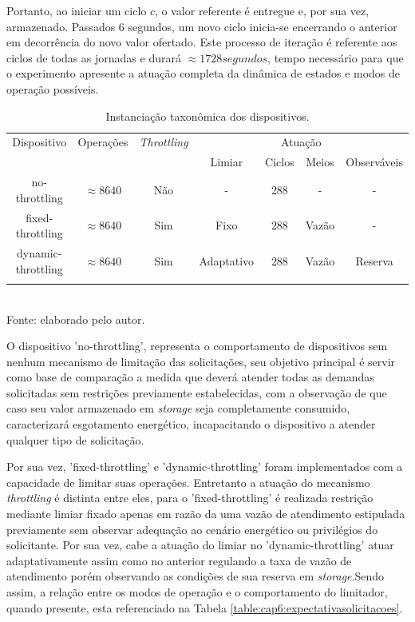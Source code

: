Portanto, ao iniciar um ciclo $c$, o valor referente é entregue e, por sua vez, armazenado. Passados 6 segundos, um novo ciclo inicia-se encerrando o anterior em decorrência do novo valor ofertado. Este processo de iteração é referente aos ciclos de todas as jornadas e durará $\approx 1728 segundos$, tempo necessário para que o experimento apresente a atuação completa da dinâmica de estados e modos de operação possíveis.

\begingroup
\begin{table}[htbp]
	
	\centering
	\caption{Instanciação taxonômica dos dispositivos.}
	\small
	\begin{tabular}{ c c c c c c c}
		\toprule
		Dispositivo & Operações & \textit{Throttling} & \multicolumn{4}{c}{Atuação}\\\cline{4-7}		
		& & & Limiar & Ciclos & Meios & Observáveis\\
		\midrule
		 no-throttling  & $\approx 8640$ &Não & - & 288 & - & - \\
		fixed-throttling  & $\approx 8640$ &Sim & Fixo & 288 & Vazão & - \\
		 dynamic-throttling  & $\approx 8640$ &Sim & Adaptativo & 288 & Vazão & Reserva \\
		\bottomrule\addlinespace[1pt]
	\end{tabular}
	\label{table:cap6:dispositivosutilizados}
	\\
	\footnotesize Fonte: elaborado pelo autor.
	
\end{table}
\endgroup

O dispositivo 'no-throttling', representa o comportamento de dispositivos sem nenhum mecanismo de limitação das solicitações, seu objetivo principal é servir como base de comparação a medida que deverá atender todas as demandas solicitadas sem restrições previamente estabelecidas, com a observação de que caso seu valor armazenado em \textit{storage} seja completamente consumido, caracterizará esgotamento energético, incapacitando o dispositivo a atender qualquer tipo de solicitação.

Por sua vez, 'fixed-throttling'  e 'dynamic-throttling' foram implementados com a capacidade de limitar suas operações. Entretanto a atuação do mecanismo \textit{throttling} é distinta entre eles, para o 'fixed-throttling' é realizada restrição mediante limiar fixado apenas em razão da uma vazão de atendimento estipulada previamente sem observar adequação ao cenário energético ou privilégios do solicitante. Por sua vez, cabe a atuação do limiar no 'dynamic-throttling' atuar adaptativamente assim como no anterior regulando a taxa de vazão de atendimento porém observando as condições de sua reserva em \textit{storage}.Sendo assim, a relação entre os modos de operação e o comportamento do limitador, quando presente, esta referenciado na Tabela \ref{table:cap6:expectativasolicitacoes}.

